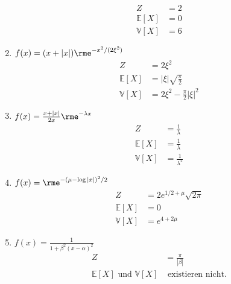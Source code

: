 \documentclass[11pt,answers]{exam}
\begin{document}
\begin{questions}
\begin{solution}
\begin{enumerate}
\begin{align*}
Z&=2
\\
\mathbb{E}[X]&=0
\\
\mathbb{V}[X]&=6
\end{align*}
\item $f(x)=(x+|x|)\rme^{-x^2/(2\xi^2)}$
\begin{align*}
Z&=2\xi^2
\\
\mathbb{E}[X]&=|\xi|\sqrt{\frac{\pi}{2}}
\\
\mathbb{V}[X]&=2\xi^2-\frac{\pi}{2}|\xi|^2
\end{align*}
\item $f(x)=\frac{x+|x|}{2x}\rme^{-\lambda x}$
\begin{align*}
Z&=\frac{1}{\lambda}
\\
\mathbb{E}[X]&=\frac{1}{\lambda}
\\
\mathbb{V}[X]&=\frac{1}{\lambda^2}
\end{align*}
\item $f(x)=\rme^{-(\mu-\log |x|)^2/2}$
\begin{align*}
Z&=2e^{1/2+\mu}\sqrt{2\pi}
\\
\mathbb{E}[X]&=0
\\
\mathbb{V}[X]&=e^{4+2\mu}
\end{align*}
\item $f(x)=\frac{1}{1+\beta^2(x-\alpha)^2}$
\begin{align*}
Z&=\frac{\pi}{|\beta|}
\\
\mathbb{E}[X] \textrm{ und } \mathbb{V}[X] & \textrm{ existieren nicht.}
\end{align*}
\end{enumerate}
\end{solution}




\end{questions}
\end{document}
